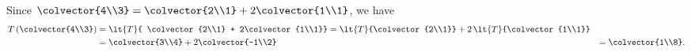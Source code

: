 Since $\colvector{4\\3}= \colvector{2\\1} + 2\colvector{1\\1}$, we have 
\begin{align*}
T\left(\colvector{4\\3}\right) 
&= \lt{T}{ \colvector{2\\1} + 2\colvector{1\\1}}
= \lt{T}{\colvector{2\\1}} + 2\,\lt{T}{\colvector{1\\1}}\\
%
&= \colvector{3\\4} + 2\colvector{-1\\2}
&= \colvector{1\\8}.
\end{align*}